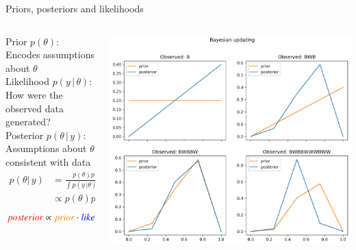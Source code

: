 \documentclass[12pt, aspectratio=149]{beamer}
\theoremstyle{plain}
\begin{document}
\begin{frame}[fragile]{Priors, posteriors and likelihoods}
	\begin{columns}
		\begin{column}{0.5\linewidth}
			Prior $p(\theta)$: Encodes assumptions about $\theta$\\
			Likelihood $p(y \, \vert \, \theta)$: How were the observed data generated? \\ 
			Posterior $p(\theta \, \vert \, y)$: Assumptions about $\theta$ consistent with data
			\begin{equation*}
			\begin{split}
			p(\theta \vert \, y) & =  \frac{p(\theta)p(y \, \vert \theta)}{\int p(y \, \vert \theta)p(\theta) \, d\theta} \\
			& \propto p(\theta)p(y \, \vert \theta)
			\end{split}
			\end{equation*}
			\begin{equation*}
			\textcolor{red}{posterior} \propto  \textcolor{orange}{prior} \cdot \textcolor{blue}{likelihood}
			\end{equation*}
		\end{column}
		\begin{column}{0.5\linewidth}
			\includegraphics[scale=0.3]{figs/updating.png}
		\end{column}
	\end{columns}
\end{frame}
\end{document}
